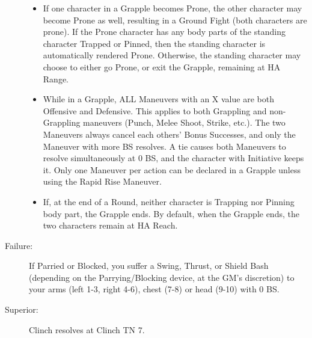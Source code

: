 \documentclass[oneside,11pt,english]{book}
\begin{document}
\begin{description}
\begin{itemize}
  \item If one character in a Grapple becomes Prone, the other character may
    become Prone as well, resulting in a Ground Fight (both characters are
    prone). If the Prone character has any body parts of the standing character
    Trapped or Pinned, then the standing character is automatically rendered
    Prone. Otherwise, the standing character may choose to either go Prone, or
    exit the Grapple, remaining at HA Range.  

  \item While in a Grapple, ALL Maneuvers with an X value are both Offensive and
  Defensive. This applies to both Grappling and non-Grappling maneuvers (Punch,
  Melee Shoot, Strike, etc.). The two Maneuvers always cancel each others' Bonus
  Successes, and only the Maneuver with more BS resolves. A tie causes both
  Maneuvers to resolve simultaneously at 0 BS, and the character with Initiative
  keeps it. Only one Maneuver per action can be declared in a Grapple unless using
  the Rapid Rise Maneuver. %

  \item If, at the end of a Round, neither character is Trapping nor Pinning body part,
  the Grapple ends. By default, when the Grapple ends, the two characters remain
  at HA Reach. 
\end{itemize}
\item [Failure:] If Parried or Blocked, you suffer a Swing, Thrust, or Shield %
  Bash (depending on the Parrying/Blocking device, at the GM's discretion) to
  your arms (left 1-3, right 4-6), chest (7-8) or head (9-10) with 0 BS. 
\item [Superior:] Clinch resolves at Clinch TN 7. 
\end{description}
\end{document}
